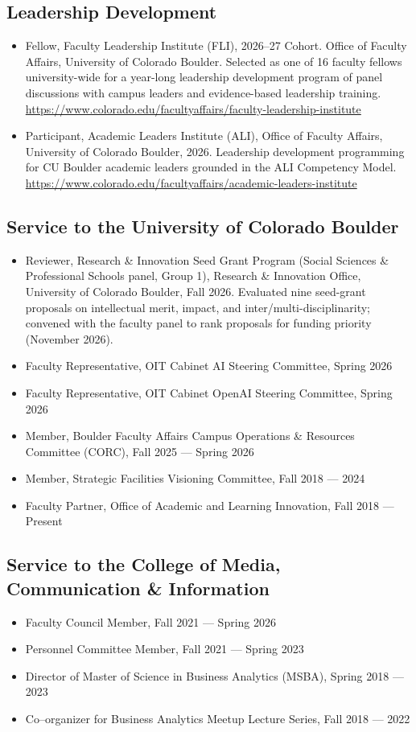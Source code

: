 \documentclass[11pt,letterpaper]{article}
\begin{document}
\subsection*{Leadership Development}
\begin{itemize}
\item Fellow, Faculty Leadership Institute (FLI), 2026--27 Cohort. Office of Faculty Affairs, University of Colorado Boulder. Selected as one of 16 faculty fellows university-wide for a year-long leadership development program of panel discussions with campus leaders and evidence-based leadership training. \url{https://www.colorado.edu/facultyaffairs/faculty-leadership-institute}
\item Participant, Academic Leaders Institute (ALI), Office of Faculty Affairs, University of Colorado Boulder, 2026. Leadership development programming for CU Boulder academic leaders grounded in the ALI Competency Model. \url{https://www.colorado.edu/facultyaffairs/academic-leaders-institute}
\end{itemize}
\subsection*{Service to the University of Colorado Boulder}
\begin{itemize}
\item Reviewer, Research \& Innovation Seed Grant Program (Social Sciences \& Professional Schools panel, Group 1), Research \& Innovation Office, University of Colorado Boulder, Fall 2026. Evaluated nine seed-grant proposals on intellectual merit, impact, and inter/multi-disciplinarity; convened with the faculty panel to rank proposals for funding priority (November 2026).
\item Faculty Representative, OIT Cabinet AI Steering Committee, Spring 2026
\item Faculty Representative, OIT Cabinet OpenAI Steering Committee, Spring 2026
\item Member, Boulder Faculty Affairs Campus Operations \& Resources Committee (CORC), Fall 2025 --- Spring 2026
\item Member, Strategic Facilities Visioning Committee, Fall 2018 --- 2024
\item Faculty Partner, Office of Academic and Learning Innovation, Fall 2018 --- Present
\end{itemize}
\subsection*{Service to the College of Media, Communication \& Information}
\begin{itemize}
\item Faculty Council Member, Fall 2021 --- Spring 2026
\item Personnel Committee Member, Fall 2021 --- Spring 2023
\item Director of Master of Science in Business Analytics (MSBA), Spring 2018 --- 2023
\item Co--organizer for Business Analytics Meetup Lecture Series, Fall 2018 --- 2022
\end{itemize}
\end{document}
